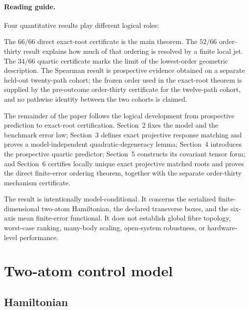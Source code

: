 \documentclass[11pt]{article}
\begin{document}
\paragraph{Reading guide.}
Four quantitative results play different logical roles:
\begin{center}
\small
{}
\end{center}
The $66/66$ direct exact-root certificate is the main theorem. The $52/66$
order-thirty result explains how much of that ordering is resolved by a finite
local jet. The $34/66$ quartic certificate marks the limit of the lowest-order
geometric description. The Spearman result is prospective evidence obtained
on a separate held-out twenty-path cohort; the frozen order used in the
exact-root theorem is supplied by the pre-outcome order-thirty certificate
for the twelve-path cohort, and no pathwise identity between the two cohorts
is claimed.

The remainder of the paper follows the logical development from prospective
prediction to exact-root certification. Section~2 fixes the model and the
benchmark error law; Section~3 defines exact projective response matching
and proves a model-independent quadratic-degeneracy lemma; Section~4
introduces the prospective quartic predictor; Section~5 constructs its
covariant tensor form; and Section~6 certifies locally unique exact
projective matched roots and proves the direct finite-error ordering
theorem, together with the separate order-thirty mechanism certificate.

The result is intentionally model-conditional. It concerns the serialized
finite-dimensional two-atom Hamiltonian, the declared transverse boxes, and
the six-axis mean finite-error functional. It does not establish global fibre
topology, worst-case ranking, many-body scaling, open-system robustness, or
hardware-level performance.

\section{Two-atom control model}

\subsection{Hamiltonian}
\end{document}
